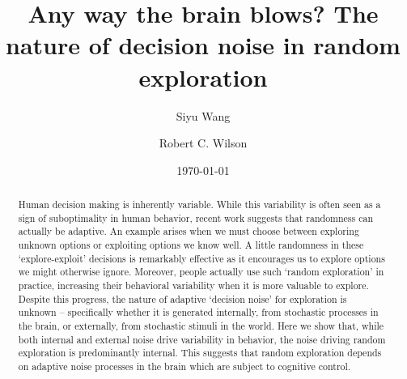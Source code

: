 \documentclass[12pt]{article}
\title{Any way the brain blows?  The nature of decision noise in random exploration}
\author[1]{Siyu Wang}
\author[1,2]{Robert C. Wilson}
\affil[1]{Department of Psychology, University of Arizona, Tucson AZ USA}
\affil[2]{Cognitive Science Program, University of Arizona, Tucson AZ USA}
\date{\today}
\begin{document}
	\maketitle
	
	\newpage
	\begin{abstract}
	
Human decision making is inherently variable. While this variability is often seen as a sign of suboptimality in human behavior, recent work suggests that randomness can actually be adaptive. An example  arises when we must choose between exploring unknown options or exploiting options we know well. A little randomness in these `explore-exploit' decisions is remarkably effective as it encourages us to explore options we might otherwise ignore. Moreover, people actually use such `random exploration' in practice,  increasing their behavioral variability when it is more valuable to explore. Despite this progress, the nature of adaptive `decision noise’ for exploration is unknown -- specifically whether it is generated internally, from stochastic processes in the brain, or externally, from stochastic stimuli in the world. Here we show that, while both internal and external noise drive variability in behavior, the noise driving random exploration is predominantly internal. This suggests that random exploration depends on adaptive noise processes in the brain which are subject to cognitive control.

	
	

\end{abstract}
\end{document}
